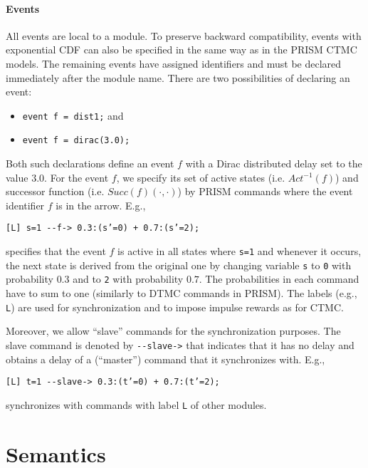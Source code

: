 \documentclass{article}
\renewcommand{\_}{\underline{~}}
\newcommand{\suc}{Succ}
\newcommand{\act}{Act}
\newcommand{\code}[1]{\texttt{#1}}
\begin{document}
\paragraph{Events}
All events are local to a module.
To preserve backward compatibility, events with exponential CDF can also be specified in the same way as in the PRISM CTMC models.
The remaining events have assigned identifiers and must be declared immediately after the module name.
There are two possibilities of declaring an event:
\begin{itemize}
	\item \code{event f = dist1;} and
	\item \code{event f = dirac(3.0);}
\end{itemize}
Both such declarations define an event $f$ with a Dirac distributed delay set to the value $3.0$.
For the event $f$, we specify its set of active states (i.e. $\act^{-1}(f)$) and successor function (i.e. $\suc(f)(\cdot,\cdot)$) by PRISM commands where the event identifier $f$ is in the arrow. 
E.g., 
\begin{center}
	\code{[L] s=1 {-}{-}f-> 0.3:(s'=0) + 0.7:(s'=2);}
\end{center}
specifies that the event $f$ is active in all states where \code{s=1} and whenever it occurs, the next state is derived from the original one by changing variable \code{s} to \code{0} with probability $0.3$ and to \code{2} with probability $0.7$. 
The probabilities in each command have to sum to one (similarly to DTMC commands in PRISM). 
The labels (e.g., \code{L}) are used for synchronization and to impose impulse rewards as for CTMC.

Moreover, we allow ``slave'' commands for the synchronization purposes. 
The slave command is denoted by \code{{-}{-}slave->} that indicates that it has no delay and obtains a delay of a (``master'') command that it synchronizes with.
E.g., 
\begin{center}
	\code{[L] t=1 {-}{-}slave-> 0.3:(t'=0) + 0.7:(t'=2);}
\end{center}
synchronizes with commands with label \code{L} of other modules.

\newpage
\section*{Semantics}
\end{document}
